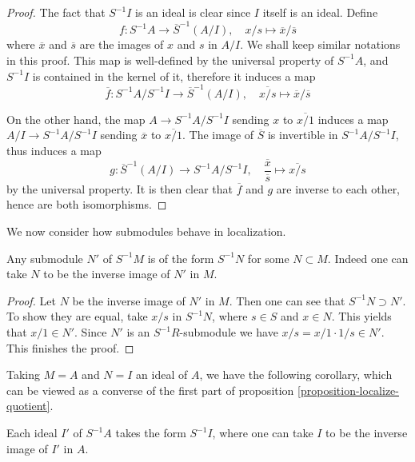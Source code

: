 \begin{proof}
The fact that $S^{-1}I$ is an ideal is clear since $I$ itself is an
ideal. Define
\[
f:S^{-1}A\longrightarrow \overline{S}^{-1}(A/I),\quad x/s\mapsto
\overline{x}/\overline{s}
\]
where $\overline{x}$ and $\overline{s}$ are the images of $x$ and
$s$ in $A/I$. We shall keep similar notations in this proof.
This map is well-defined by the universal property of
$S^{-1}A$, and $S^{-1}I$ is contained in the kernel of it,
therefore it induces a map
\[
\overline{f}:S^{-1}A/S^{-1}I \longrightarrow \overline{S}^{-1}(A/I),\quad
\overline{x/s}\mapsto \overline{x}/\overline{s}
\]

\medskip\noindent
On the other hand, the map $A\rightarrow S^{-1}A/S^{-1}I$ sending $x$ to
$\overline{x/1}$ induces a map $A/I \rightarrow S^{-1}A/S^{-1}I$ sending
$\overline{x}$ to $\overline{x/1}$. The image of $\overline{S}$ is
invertible in $S^{-1}A/S^{-1}I$, thus induces a map
\[
g:\overline{S}^{-1}(A/I) \longrightarrow S^{-1}A/S^{-1}I, \quad
\frac{\overline{x}}{\overline{s}}\mapsto \overline{x/s}
\]
by the universal property. It is then clear that $\overline{f}$ and $g$
are inverse to each other, hence are both isomorphisms.
\end{proof}

\noindent
We now consider how submodules behave in localization.

\begin{lemma}
\label{lemma-submodule-localization}
Any submodule $N'$ of $S^{-1}M$ is of the form $S^{-1}N$ for some
$N\subset M$. Indeed one can take $N$ to be the inverse image of
$N'$ in $M$.
\end{lemma}

\begin{proof}
Let $N$ be the inverse image of $N'$ in $M$. Then one can see that
$S^{-1}N\supset N'$. To show they are equal, take $x/s$ in
$S^{-1}N$, where $s\in S$ and $x\in N$. This yields that $x/1\in
N'$. Since $N'$ is an $S^{-1}R$-submodule we have
$x/s=x/1\cdot1/s\in N'$. This finishes the proof.
\end{proof}

\noindent
Taking $M=A$ and $N=I$ an ideal of $A$, we have the following
corollary, which can be viewed as a converse of the first part of
proposition \ref{proposition-localize-quotient}.

\begin{lemma}
Each ideal $I'$ of $S^{-1}A$ takes the form $S^{-1}I$, where one can
take $I$ to be the inverse image of $I'$ in $A$.
\end{lemma}


